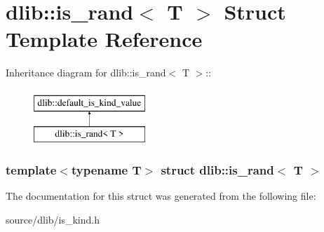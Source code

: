 \hypertarget{structdlib_1_1is__rand}{
\section{dlib::is\_\-rand$<$ T $>$ Struct Template Reference}
\label{structdlib_1_1is__rand}
}
Inheritance diagram for dlib::is\_\-rand$<$ T $>$::\begin{figure}[H]
\begin{center}
\leavevmode
\includegraphics[height=2cm]{structdlib_1_1is__rand}
\end{center}
\end{figure}
\subsubsection*{template$<$typename T$>$ struct dlib::is\_\-rand$<$ T $>$}



The documentation for this struct was generated from the following file:\begin{DoxyCompactItemize}
\item 
source/dlib/is\_\-kind.h\end{DoxyCompactItemize}
